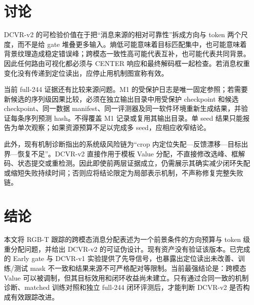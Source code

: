 \documentclass[journal]{IEEEtran}
\begin{document}
\section{讨论}
DCVR-v2 的可检验价值在于把“消息来源的相对可靠性”拆成方向与 token 两个尺度，而不是给 gate 堆叠更多输入。熵低可能意味着目标匹配集中，也可能意味着背景纹理造成稳定错误峰；跨模态一致性高可能代表互补，也可能代表共同背景。因此任何路由可视化都必须与 CENTER 响应和最终解码框一起检查。若消息权重变化没有传递到定位读出，应停止用机制图宣称有效。

当前 full-244 证据还有比较来源问题。M1 的受保护日志是唯一固定参照；若需要新候选的序列级因果比较，必须在独立输出目录中用受保护 checkpoint 和候选 checkpoint、同一数据 manifest、同一评测器及同一软件环境重新生成结果，并验证每条序列预测 hash。不得覆盖 M1 记录或复用其输出目录。单 seed 结果只能报告为单次观察；如果资源预算不足以完成多 seed，应相应收窄结论。

此外，现有机制诊断指出的系统级风险链为“crop 内定位失配—反馈漂移—目标出界—恢复不足”。DCVR-v2 直接作用于模板 Value 分配，不直接修改选峰、框解码、状态提交或重检测。因此即使前两层证据成立，仍需展示其确实减少闭环失配或缩短失败持续时间；否则应将结论限定为局部表示机制，不声称修复完整失败链。

\section{结论}
本文将 RGB-T 跟踪的跨模态消息分配表述为一个前景条件的方向预算与 token 级重分配问题，并给出 DCVR-v2 的可证伪设计。现有资产没有验证该版本。已完成的 Early gate 与 DCVR-v1 实验提供了先导信号，也暴露出定位读出未改善、训练/测试 mask 不一致和结果来源不可严格配对等限制。当前最强结论是：跨模态 Value 可以被调制，但其目标效用和闭环收益尚未建立。只有通过合同一致的机制诊断、matched 训练对照和独立 full-244 闭环评测后，才能判断 DCVR-v2 是否构成有效跟踪改进。

\balance


\end{document}
